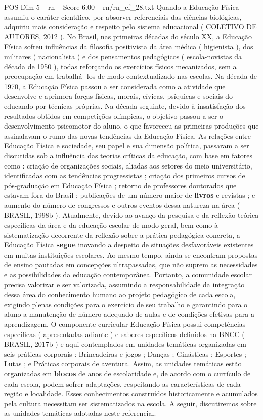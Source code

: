 \begin{textsample}{POS Dim 5 – rn – Score 6.00 – rn/rn\_ef\_28.txt}
Quando a Educação Física assumiu o caráter científico, por absorver referenciais das ciências biológicas, adquiriu mais consideração e respeito pelo sistema educacional ( COLETIVO DE AUTORES, 2012 ).
No Brasil, nas primeiras décadas do século XX, a Educação Física sofreu influências da filosofia positivista da área médica ( higienista ), dos militares ( nacionalista ) e dos pensamentos pedagógicos ( escola-novistas da década de 1950 ), todas reforçando os exercícios físicos mecanizados, sem a preocupação em trabalhá -los de modo contextualizado nas escolas.
Na década de 1970, a Educação Física passou a ser considerada como a atividade que desenvolve e aprimora forças físicas, morais, cívicas, psíquicas e sociais do educando por técnicas próprias.
Na década seguinte, devido à insatisfação dos resultados obtidos em competições olímpicas, o objetivo passou a ser o desenvolvimento psicomotor do aluno, o que favoreceu as primeiras produções que assinalavam o rumo das novas tendências da Educação Física.
As relações entre Educação Física e sociedade, seu papel e sua dimensão política, passaram a ser discutidas sob a influência das teorias críticas da educação, com base em fatores como : criação de organizações sociais, aliadas aos setores do meio universitário, identificadas com as tendências progressistas ; criação dos primeiros cursos de pós-graduação em Educação Física ; retorno de professores doutorados que estavam fora do Brasil ; publicações de um número maior de \textbf{livros} e revistas ; e aumento do número de congressos e outros eventos dessa natureza na área ( BRASIL, 1998b ).
Atualmente, devido ao avanço da pesquisa e da reflexão teórica específicas da área e da educação escolar de modo geral, bem como à sistematização decorrente da reflexão sobre a prática pedagógica concreta, a Educação Física \textbf{segue} inovando a despeito de situações desfavoráveis existentes em muitas instituições escolares.
Ao mesmo tempo, ainda se encontram propostas de ensino pautadas em concepções ultrapassadas, que não suprem as necessidades e as possibilidades da educação contemporânea.
Portanto, a comunidade escolar precisa valorizar e ser valorizada, assumindo a responsabilidade da integração dessa área do conhecimento humano ao projeto pedagógico de cada escola, exigindo plenas condições para o exercício de seu trabalho e garantindo para o aluno a manutenção de número adequado de aulas e de condições efetivas para a aprendizagem.
O componente curricular Educação Física possui competências específicas ( apresentadas adiante ) e saberes específicos definidos na BNCC ( BRASIL, 2017b ) e aqui contemplados em unidades temáticas organizadas em seis práticas corporais : Brincadeiras e jogos ; Danças ; Ginásticas ; Esportes ; Lutas ; e Práticas corporais de aventura.
Assim, as unidades temáticas estão organizadas em \textbf{blocos} de anos de escolaridade e, de acordo com o currículo de cada escola, podem sofrer adaptações, respeitando as características de cada região e localidade.
Esses conhecimentos construídos historicamente e acumulados pela cultura necessitam ser sistematizados na escola.
A seguir, discutiremos sobre as unidades temáticas adotadas neste referencial.

\end{textsample}
